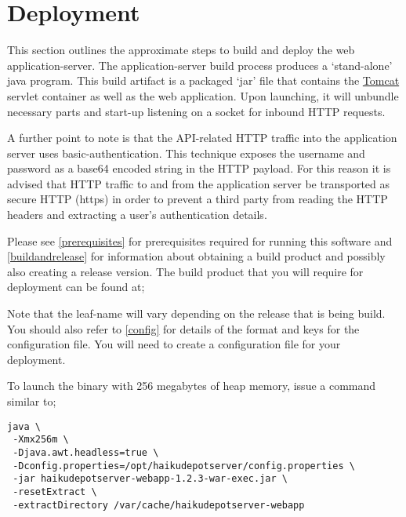 \section{Deployment}

This section outlines the approximate steps to build and deploy the web application-server.  The application-server build process produces a  `stand-alone' java program.  This build artifact is a packaged `jar' file that contains the \href{http://tomcat.apache.org}{Tomcat} servlet container as well as the web application.  Upon launching, it will unbundle necessary parts and start-up listening on a socket for inbound HTTP requests.


A further point to note is that the API-related HTTP traffic into the application server uses basic-authentication.  This technique exposes the username and password as a base64 encoded string in the HTTP payload.  For this reason it is advised that HTTP traffic to and from the application server be transported as secure HTTP (https) in order to prevent a third party from reading the HTTP headers and extracting a user's authentication details.

Please see \ref{prerequisites} for prerequisites required for running this software and \ref{buildandrelease} for information about obtaining a build product and possibly also creating a release version.  The build product that you will require for deployment can be found at;


Note that the leaf-name will vary depending on the release that is being build.  You should also refer to \ref{config} for details of the format and keys for the configuration file.  You will need to create a configuration file for your deployment.

To launch the binary with 256 megabytes of heap memory, issue a command similar to;

\begin{verbatim}
java \
 -Xmx256m \
 -Djava.awt.headless=true \
 -Dconfig.properties=/opt/haikudepotserver/config.properties \
 -jar haikudepotserver-webapp-1.2.3-war-exec.jar \
 -resetExtract \
 -extractDirectory /var/cache/haikudepotserver-webapp
\end{verbatim}

